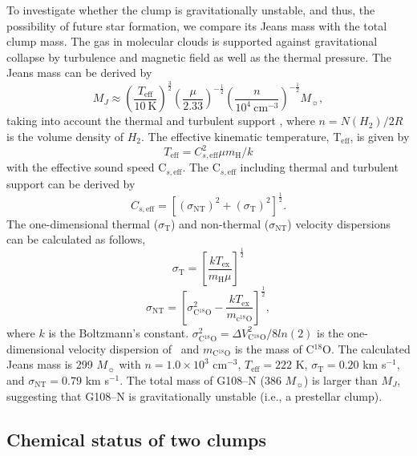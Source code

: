 \documentclass[manuscript]{aastex}
\begin{document}
To investigate whether the clump is gravitationally unstable, and thus, the possibility of future star formation, we compare its Jeans mass with the total clump mass.
The gas in molecular clouds is supported against gravitational collapse by turbulence and magnetic field as well as the thermal pressure.
The Jeans mass can be derived by
\begin{equation}
M_J \approx \left(\frac{T_{\textrm{eff}}}{10\:\textrm{K}}\right)^{\frac{3}{2}}\left(\frac{\mu}{2.33}\right)^{-\frac{1}{2}}\left(\frac{n}{10^{4}\:\textrm{cm}^{-3}}\right)^{-\frac{1}{2}} M_{\sun},
\end{equation}
taking into account the thermal and turbulent support \citep{hennebelle08}, where $n=N(H_2)/2R$ is the volume density of $H_2$.
The effective kinematic temperature, T$_{\textrm{eff}}$, is given by
\begin{equation}
T_{\textrm{eff}}= C^{2}_{s, \textrm{eff}}  {\mu}m_{\textrm{H}}/ k
\end{equation}
with the effective sound speed C$_{s, {\textrm{eff}}}$.
The C$_{s, {\textrm{eff}}}$ including thermal and turbulent support can be derived by
\begin{equation}
C_{s, {\textrm{eff}}}= \left[({\sigma}_{\textrm{NT}})^{2} + ({\sigma}_{\textrm{T}})^{2}\right]^{\frac{1}{2}}.
\end{equation}
The one-dimensional thermal (${\sigma}_{\textrm{T}}$) and non-thermal (${\sigma}_{\textrm{NT}}$) velocity dispersions can be calculated as follows,
\begin{equation}
{\sigma}_{\textrm{T}}= \left[\frac{kT_{\textrm{ex}}}{m_{\textrm{H}}\mu}\right]^{\frac{1}{2}}
\end{equation}
\begin{equation}
{\sigma}_{\textrm{NT}}= \left[{\sigma}^{2}_{\textrm{C$^{18}$O}} - \frac{kT_{\textrm{ex}}}{m_{\textrm{c$^{18}$O}}}\right]^{\frac{1}{2}},
\end{equation}
where $k$ is the Boltzmann's constant.
${\sigma}^{2}_{\textrm{C$^{18}$O}}=\Delta V^{2}_{\textrm{C$^{18}$O}}/8ln(2)$ is the one-dimensional velocity dispersion of \ceot\ and $m_{\textrm{C$^{18}$O}}$ is the mass of C$^{18}$O.
The calculated Jeans mass is 299 $M_{\sun}$ with $n=1.0\times10^3$ cm$^{-3}$, $T_{\textrm{eff}}=222$ K, $\sigma_{\textrm{T}}=0.20$ km s$^{-1}$, and $\sigma_{\textrm{NT}}=0.79$ km s$^{-1}$.
The total mass of G108--N (386 $M_{\sun}$) is larger than $M_J$, suggesting that G108--N is gravitationally unstable (i.e., a prestellar clump).


\subsection{Chemical status of two clumps}
\end{document}
